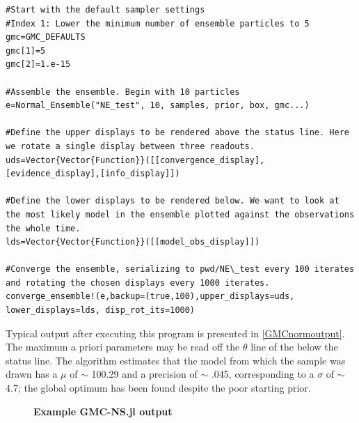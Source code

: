 \documentclass{ut-thesis}
\begin{document}
\begin{NoHyper}
\begin{verbatim}
#Start with the default sampler settings
#Index 1: Lower the minimum number of ensemble particles to 5
gmc=GMC_DEFAULTS
gmc[1]=5
gmc[2]=1.e-15

#Assemble the ensemble. Begin with 10 particles
e=Normal_Ensemble("NE_test", 10, samples, prior, box, gmc...)

#Define the upper displays to be rendered above the status line. Here we rotate a single display between three readouts.
uds=Vector{Vector{Function}}([[convergence_display],[evidence_display],[info_display]])

#Define the lower displays to be rendered below. We want to look at the most likely model in the ensemble plotted against the observations the whole time.
lds=Vector{Vector{Function}}([[model_obs_display]])

#Converge the ensemble, serializing to pwd/NE\_test every 100 iterates and rotating the chosen displays every 1000 iterates.
converge_ensemble!(e,backup=(true,100),upper_displays=uds, lower_displays=lds, disp_rot_its=1000)
\end{verbatim}

Typical output after executing this program is presented in \autoref{GMCnormoutput}. The maximum a priori parameters may be read off the $\theta$ line of the  below the status line. The algorithm estimates that the model from which the sample was drawn has a $\mu$ of $\sim$ 100.29 and a precision of $\sim$ .045, corresponding to a $\sigma$ of $\sim$ 4.7; the global optimum has been found despite the poor starting prior.

\begin{figure}[!h]
    \caption{{\bf Example GMC-NS.jl output}}
    \label{GMCnormoutput}
\end{figure}


\end{NoHyper}
\end{document}
